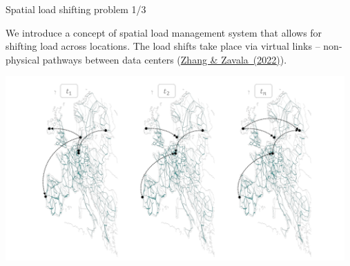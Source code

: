 \begin{frame}{Spatial load shifting problem 1/3}

  {\footnotesize

  We introduce a concept of \alert{spatial load management system} that allows for shifting load across locations. The load shifts take place via \alert{virtual links} -- non-physical pathways between data centers (\href{https://doi.org/10.1016/j.apenergy.2022.119930}{Zhang \& Zavala~(2022)}).

  \centering
  \vspace{-0.2cm}
  \hspace*{0.5cm}\includegraphics[width=13cm]{images/spatial-vlinks.png}
  }
\end{frame}


